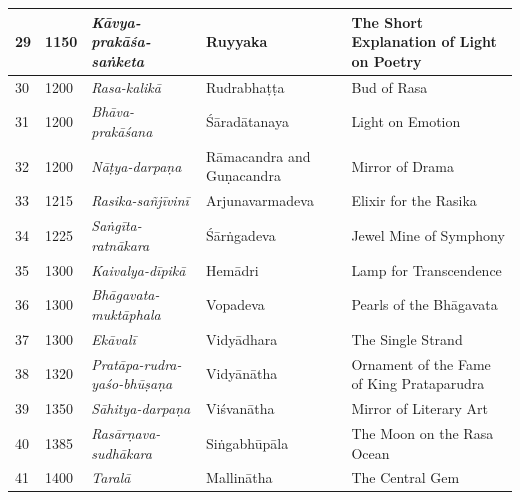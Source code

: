 \begin{longtable}{|l|p{1.1cm}|p{1.97cm}|p{1.98cm}|p{1.97cm}|}
\hline
29 & 1150 & \textit{Kāvya-prakāśa-saṅketa}\index{Kavyaprakasasanketa@\textit{Kāvya-prakāśa-saṅketa}} & Ruyyaka & The Short Explanation of Light on Poetry \\
\hline
30 & 1200 & \textit{Rasa-kalikā}\index{Rasakalika@\textit{Rasa-kalikā}} & Rudrabhaṭṭa\index{Rudrabhatta@Rudrabhaṭṭa} & Bud of Rasa\index{rasa@\textit{rasa}} \\
\hline
31 & 1200 & \textit{Bhāva-prakāśana}\index{Bhavaprakasana@\textit{Bhāva-prakāśana}} & Śāradātanaya\index{Saradatanaya@Śaradā-tanaya} & Light on Emotion \\
\hline
32 & 1200 & \textit{Nāṭya-darpaṇa}\index{Natyadarpana@\textit{Nāṭya-darpaṇa}} & Rāmacandra\index{Ramacandra@Rāmacandra} and Guṇacandra\index{Gunacandra@Guṇacandra} & Mirror of Drama \\
\hline
33 & 1215 & \textit{Rasika-sañjīvinī}\index{Rasikasanjivini@\textit{Rasika-sañjīvinī}} & Arjunavarma\-deva\index{Arjunavarmadeva} & Elixir for the Rasika\index{rasika@\textit{rasika}} \\
\hline
34 & 1225 & \textit{Saṅgīta-ratnākara}\index{Sangitaratnakara@\textit{Saṅgīta-ratnākara}} & Śārṅgadeva\index{Sarngadeva@Śārṅgadeva} & Jewel Mine of Symphony \\
\hline
35 & 1300 & \textit{Kaivalya-dīpikā}\index{Kaivalyadipika@\textit{Kaivalya-dīpikā}} & Hemādri\index{Hemadri@Hemādri} & Lamp for Transcendence \\
\hline
36 & 1300 & \textit{Bhāgavata-muktāphala}\index{Bhagavatamuktaphala@\textit{Bhāgavata-muktāphala}} & Vopadeva & Pearls of the Bhāgavata \\
\hline
37 & 1300 & \textit{Ekāvalī}\index{Ekavali@\textit{Ekāvalī}} & Vidyādhara & The Single Strand \\
\hline
38 & 1320 & \textit{Pratāpa-rudra-yaśo-bhūṣaṇa}\index{Prataparudrayasobhusana@\textit{Pratāparudra-yaśobhūṣaṇa}} & Vidyānātha & Ornament of the Fame of King Prataparudra \\
\hline
39 & 1350 & \textit{Sāhitya-darpaṇa}\index{Sahityadarpana@\textit{Sāhitya-darpaṇa}} & Viśvanātha & Mirror of Literary Art \\
\hline
40 & 1385 & \textit{Rasārṇava-sudhākara}\index{Rasarnavasudhakara@\textit{Rasārṇava-sudhākara}} & Siṅgabhūpāla\index{Singabhupala@Siṅgabhūpāla} & The Moon on the Rasa\index{rasa@\textit{rasa}} Ocean \\
\hline
41 & 1400 & \textit{Taralā}\index{Tarala@\textit{Taralā}} & Mallinātha\index{Mallinatha@Mallinātha} & The Central Gem \\

\end{longtable}
